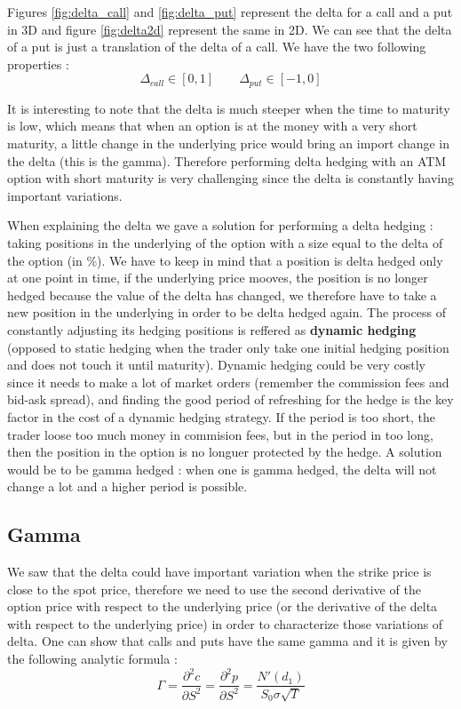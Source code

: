 \documentclass[hidelinks]{article}
\begin{document}
Figures \ref{fig:delta_call} and \ref{fig:delta_put} represent the delta for a call and a put in 3D and figure \ref{fig:delta2d} represent the same in 2D. We can see that the delta of a put is just a translation of the delta of a call. We have the two following properties :
$$ \Delta_{call} \in [0,1] \quad \quad \Delta_{put} \in [-1,0]$$

It is interesting to note that the delta is much steeper when the time to maturity is low, which means that when an option is at the money with a very short maturity, a little change in the underlying price would bring an import change in the delta (this is the gamma). Therefore performing delta hedging with an ATM option with short maturity is very challenging since the delta is constantly having important variations.

When explaining the delta we gave a solution for performing a delta hedging : taking positions in the underlying of the option with a size equal to the delta of the option (in \%). We have to keep in mind that a position is delta hedged only at one point in time, if the underlying price mooves, the position is no longer hedged because the value of the delta has changed, we therefore have to take a new position in the underlying in order to be delta hedged again. The process of constantly adjusting its hedging positions is reffered as \textbf{dynamic hedging} (opposed to static hedging when the trader only take one initial hedging position and does not touch it until maturity). Dynamic hedging could be very costly since it needs to make a lot of market orders (remember the commission fees and bid-ask spread), and finding the good period of refreshing for the hedge is the key factor in the cost of a dynamic hedging strategy. If the period is too short, the trader loose too much money in commision fees, but in the period in too long, then the position in the option is no longuer protected by the hedge. A solution would be to be gamma hedged : when one is gamma hedged, the delta will not change a lot and a higher period is possible.
\newpage
\subsection{Gamma}

	We saw that the delta could have important variation when the strike price is close to the spot price, therefore we need to use the second derivative of the option price with respect to the underlying price (or the derivative of the delta with respect to the underlying price) in order to characterize those variations of delta. One can show that calls and puts have the same gamma and it is given by the following analytic formula :
	$$ \Gamma= \frac{\partial^2 c}{\partial S^2} =\frac{\partial^2 p}{\partial S^2} = \frac{N'(d_1)}{S_0 \sigma \sqrt{T}}$$
	
\end{document}
